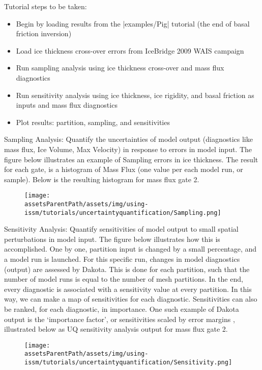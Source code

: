 Tutorial steps to be taken:
\begin{itemize}
	\item Begin by loading results from the \lstinlinebg|examples/Pig| tutorial (the end of basal friction inversion)
	\item Load ice thickness cross-over errors from IceBridge 2009 WAIS campaign
	\item Run sampling analysis using ice thickness cross-over and mass flux diagnostics
	\item Run sensitivity analysis using ice thickness, ice rigidity, and basal friction as inputs and mass flux diagnostics
	\item Plot results: partition, sampling, and sensitivities
\end{itemize}
Sampling Analysis:
Quantify the uncertainties of model output (diagnostics like mass flux, Ice Volume, Max Velocity) in response to errors in model input. The figure below illustrates an example of Sampling errors in ice thickness. The result for each gate, is a histogram of Mass Flux (one value per each model run, or sample).
Below is the resulting histogram for mass flux gate 2.
\begin{figure}[H]
	\begin{center}
		\texttt{[image: \\assetsParentPath/assets/img/using-issm/tutorials/uncertaintyquantification/Sampling.png]}
	\end{center}
\end{figure}

Sensitivity Analysis:
Quantify sensitivities of model output to small spatial perturbations in model input. The figure below illustrates how this is accomplished. One by one, partition input is changed by a small percentage, and a model run is launched. For this specific run, changes in model diagnostics (output) are assessed by Dakota. This is done for each partition, such that the number of model runs is equal to the number of mesh partitions. In the end, every diagnostic is associated with a sensitivity value at every partition. In this way, we can make a map of sensitivities for each diagnostic. Sensitivities can also be ranked, for each diagnostic, in importance. One such example of Dakota output is the `importance factor', or sensitivities scaled by error margins
\citep{Larour2012a, Larour2012b}, illustrated below as UQ sensitivity analysis output for mass flux
gate 2.
\begin{figure}[H]
	\begin{center}
		\texttt{[image: \\assetsParentPath/assets/img/using-issm/tutorials/uncertaintyquantification/Sensitivity.png]}
	\end{center}
\end{figure}

